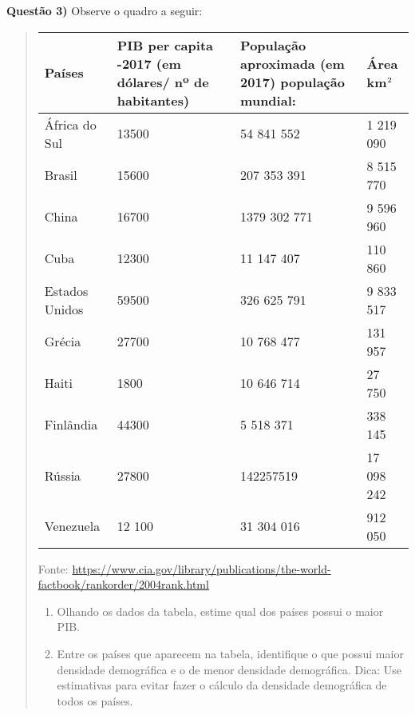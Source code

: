 \textbf{Questão 3)} Observe o quadro a seguir:
\begin{quote}


\begin{savenotes}\sphinxattablestart
\centering
\begin{tabulary}{\linewidth}[t]{|T|T|T|T|}
\hline

Países
&
PIB per capita -2017
(em dólares/ nº de
habitantes)
&
População aproximada
(em 2017)
população mundial:
&
Área
km\(\sp{\text{2}}\)
\\
\hline
África do Sul
&
13500
&
54 841 552
&
1 219 090
\\
\hline
Brasil
&
15600
&
207 353 391
&
8 515 770
\\
\hline
China
&
16700
&
1379 302 771
&
9 596 960
\\
\hline
Cuba
&
12300
&
11 147 407
&
110 860
\\
\hline
Estados Unidos
&
59500
&
326 625 791
&
9 833 517
\\
\hline
Grécia
&
27700
&
10 768 477
&
131 957
\\
\hline
Haiti
&
1800
&
10 646 714
&
27 750
\\
\hline
Finlândia
&
44300
&
5 518 371
&
338 145
\\
\hline
Rússia
&
27800
&
142257519
&
17 098 242
\\
\hline
Venezuela
&
12 100
&
31 304 016
&
912 050
\\
\hline
\end{tabulary}
\par
\sphinxattableend\end{savenotes}

Fonte: \url{https://www.cia.gov/library/publications/the-world-factbook/rankorder/2004rank.html}
\begin{enumerate}
\item {} 
Olhando os dados da tabela, estime qual dos países possui o maior PIB.

\item {} 
Entre os países que aparecem na  tabela, identifique o que possui maior densidade demográfica    e o de  menor densidade demográfica. Dica: Use estimativas para evitar fazer o cálculo da densidade demográfica de todos os países.

\end{enumerate}
\end{quote}

